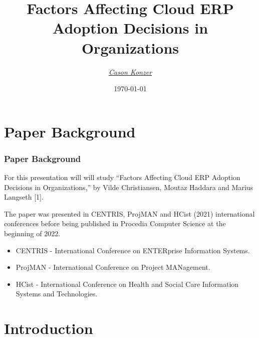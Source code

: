 \documentclass{beamer}
\title[Factors Affecting Cloud ERP Adoption Decisions in Organizations]{Factors Affecting Cloud ERP Adoption Decisions in Organizations}
\author{\XV\textit{\large{\href{https://github.com/casonk}{Cason Konzer}}}\XB}
\institute[UM FLINT]{\normalsize{\textit{casonk@umich.edu}}}
\date[]{\today}
\begin{document}
\begin{frame}
    \titlepage
\end{frame}




\section{Paper Background}

\begin{frame}

    \frametitle{Paper Background}

    For this presentation will will study ``Factors Affecting Cloud ERP Adoption Decisions in Organizations,'' by Vilde Christiansen, Moutaz Haddara and Marius Langseth [1]. \pause

    \vspace{5mm}
    The paper was presented in CENTRIS, ProjMAN and HCist (2021) international conferences before being published in Procedia Computer Science at the beginning of 2022. \pause

    \vspace{2.5mm}
    \begin{itemize}
        \item[$\diamond$] CENTRIS - International Conference on ENTERprise Information Systems. \pause
        \item[$\diamond$] ProjMAN - International Conference on Project MANagement. \pause
        \item[$\diamond$] HCist - International Conference on Health and Social Care Information Systems and Technologies.
    \end{itemize}

\end{frame}


\section{Introduction}
\end{document}
